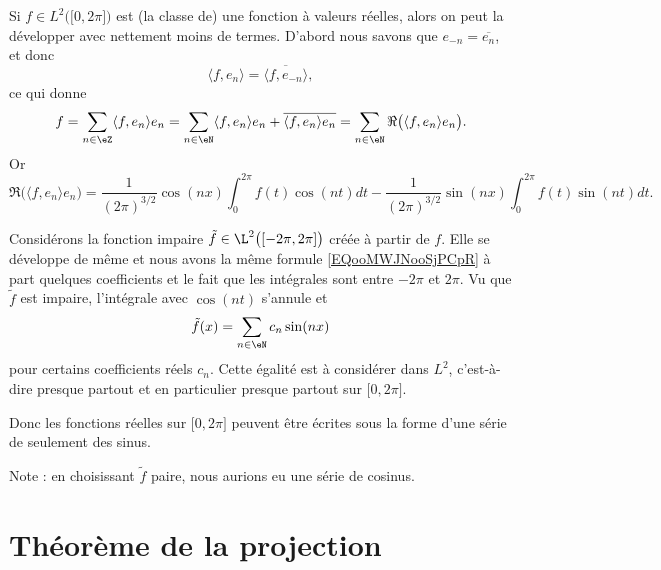 \begin{example}     \label{EXooQDWUooLtuIOm}
    Si \( f\in L^2\big( \mathopen[ 0 , 2\pi \mathclose] \big)\) est (la classe de) une fonction à valeurs réelles, alors on peut la développer avec nettement moins de termes. D'abord nous savons que \( e_{-n}=\overline{ e_n }\), et donc
    \begin{equation}
        \langle f, e_n\rangle =\overline{ \langle f, e_{-n}\rangle  },
    \end{equation}
    ce qui donne
    \begin{equation}
        f=\sum_{n\in\eZ}\langle f, e_n\rangle e_n=\sum_{n\in \eN}\langle f, e_n\rangle e_n +\overline{ \langle f, e_n\rangle e_n }=\sum_{n\in \eN}\Re\big( \langle f, e_n\rangle e_n \big).
    \end{equation}
    Or
    \begin{equation}        \label{EQooMWJNooSjPCpR}
        \Re\big( \langle f, e_n\rangle e_n \big)=\frac{1}{ (2\pi)^{3/2} }\cos(nx)\int_0^{2\pi}f(t)\cos(nt)dt-\frac{1}{ (2\pi)^{3/2} }\sin(nx)\int_0^{2\pi}f(t)\sin(nt)dt.
    \end{equation}

    Considérons la fonction impaire \( \tilde f\in\L^2\big( [-2\pi,2\pi] \big)\) créée à partir de \( f\). Elle se développe de même et nous avons la même formule \eqref{EQooMWJNooSjPCpR} à part quelques coefficients et le fait que les intégrales sont entre \( -2\pi\) et \( 2\pi\). Vu que \( \tilde f\) est impaire, l'intégrale avec \( \cos(nt)\) s'annule et
    \begin{equation}
        \tilde f(x)=\sum_{n\in \eN}c_n\sin(nx)
    \end{equation}
    pour certains coefficients réels \( c_n\). Cette égalité est à considérer dans \( L^2\), c'est-à-dire presque partout et en particulier presque partout sur \( \mathopen[ 0 , 2\pi \mathclose]\).

    Donc les fonctions réelles sur \( \mathopen[ 0 , 2\pi \mathclose]\) peuvent être écrites sous la forme d'une série de seulement des sinus.

    Note : en choisissant \( \tilde f\) paire, nous aurions eu une série de cosinus.
\end{example}

\section{Théorème de la projection}

